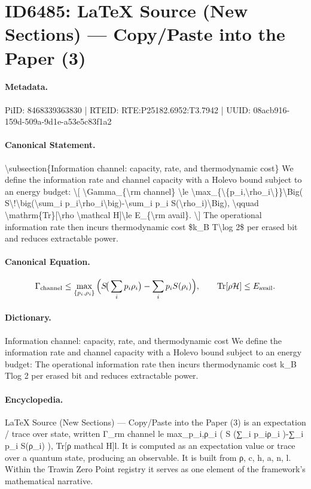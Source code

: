 \section*{ID6485: LaTeX Source (New Sections) — Copy/Paste into the Paper (3)}
\paragraph{Metadata.}
PiID: 8468339363830 | RTEID: RTE:P25182.6952:T3.7942 | UUID: 08acb916-159d-509a-9d1e-a53e5c83f1a2

\paragraph{Canonical Statement.}
\textbackslash{}subsection\{Information channel: capacity, rate, and thermodynamic cost\} We define the information rate and channel capacity with a Holevo bound subject to an energy budget: \textbackslash{}[ \textbackslash{}Gamma\_\{\textbackslash{}rm channel\} \textbackslash{}le \textbackslash{}max\_\{\textbackslash{}\{p\_i,\textbackslash{}rho\_i\textbackslash{}\}\}\textbackslash{}Big( S\textbackslash{}!\textbackslash{}big(\textbackslash{}sum\_i p\_i\textbackslash{}rho\_i\textbackslash{}big)-\textbackslash{}sum\_i p\_i S(\textbackslash{}rho\_i)\textbackslash{}Big), \textbackslash{}qquad \textbackslash{}mathrm\{Tr\}[\textbackslash{}rho \textbackslash{}mathcal H]\textbackslash{}le E\_\{\textbackslash{}rm avail\}. \textbackslash{}] The operational information rate then incurs thermodynamic cost \$k\_B T\textbackslash{}log 2\$ per erased bit and reduces extractable power.

\paragraph{Canonical Equation.}
\[
\Gamma_{\rm channel} \le \max_{\{p_i,\rho_i\}}\Big( S\!\big(\sum_i p_i\rho_i\big)-\sum_i p_i S(\rho_i)\Big), \qquad \mathrm{Tr}[\rho \mathcal H]\le E_{\rm avail}.
\]

\paragraph{Dictionary.}
Information channel: capacity, rate, and thermodynamic cost We define the information rate and channel capacity with a Holevo bound subject to an energy budget: The operational information rate then incurs thermodynamic cost k\_B Tlog 2 per erased bit and reduces extractable power.

\paragraph{Encyclopedia.}
LaTeX Source (New Sections) — Copy/Paste into the Paper (3) is an expectation / trace over state, written Γ\_rm channel le max\_p\_i,ρ\_i ( S (∑\_i p\_iρ\_i )-∑\_i p\_i S(ρ\_i) ), Tr[ρ mathcal H]l. It is computed as an expectation value or trace over a quantum state, producing an observable. It is built from ρ, c, h, a, n, l. Within the Trawin Zero Point registry it serves as one element of the framework's mathematical narrative.
